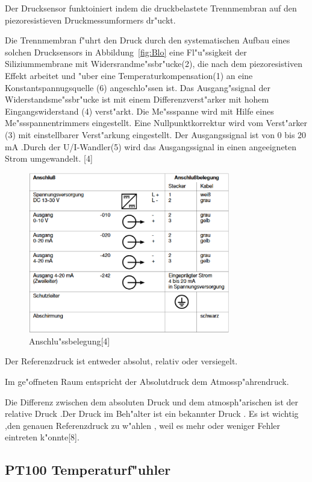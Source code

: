 Der Drucksensor funktoiniert indem die druckbelastete Trennmembran 
auf den piezoresistieven Druckmessumformers dr"uckt.

Die  Trennmembran f"uhrt den Druck durch den systematischen Aufbau eines
solchen Drucksensors in Abbildung~\ref{fig:Blo}  
eine Fl"u"ssigkeit der Siliziummembrane mit Widersrandme"ssbr"ucke(2),
die nach dem piezoresistiven Effekt arbeitet und 
"uber eine Temperaturkompensation(1) an eine Konstantspannugsquelle (6)
angeschlo"ssen ist.
Das Ausgang"ssignal der Widerstandsme"ssbr"ucke ist mit
einem Differenzverst"arker mit hohem Eingangswiderstand (4) verst"arkt.
Die Me"ssspanne wird mit Hilfe eines Me"ssspannentrimmers eingestellt.
Eine Nullpunktkorrektur wird vom Verst"arker (3) mit einstellbarer 
Verst"arkung eingestellt. Der Ausgangssignal ist  
 von 0 bis 20 mA .Durch der U/I-Wandler(5) wird 
 das Ausgangssignal in einen angeeigneten Strom umgewandelt. [4]
 
 \begin{figure}[!htb]
\begin{center}
\includegraphics[height=7cm]{bilder/Anschluss.eps}
\end{center}
\caption{Anschlu"ssbelegung[4]}
\end{figure}

Der Referenzdruck ist entweder absolut, 
relativ oder versiegelt. 
  
 Im ge"offneten Raum entspricht der Absolutdruck dem Atmossp"ahrendruck.


Die Differenz zwischen dem absoluten Druck und dem atmosph"arischen ist 
der relative Druck .Der Druck im Beh"alter ist ein bekannter Druck .
Es ist wichtig ,den genauen Referenzdruck zu w"ahlen ,
weil es mehr oder weniger  Fehler eintreten k"onnte[8].

\subsection{PT100 Temperaturf"uhler}

